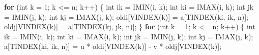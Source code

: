 \documentclass[
  12pt,
  letterpaper,
  DIV=11,
  numbers=noendperiod]{scrreprt}
\newenvironment{Shaded}{\begin{snugshade}}{\end{snugshade}}
\newcommand{\ControlFlowTok}[1]{\textcolor[rgb]{0.00,0.23,0.31}{\textbf{#1}}}
\newcommand{\DataTypeTok}[1]{\textcolor[rgb]{0.68,0.00,0.00}{#1}}
\newcommand{\DecValTok}[1]{\textcolor[rgb]{0.68,0.00,0.00}{#1}}
\newcommand{\NormalTok}[1]{\textcolor[rgb]{0.00,0.23,0.31}{#1}}
\newcommand{\OperatorTok}[1]{\textcolor[rgb]{0.37,0.37,0.37}{#1}}
\theoremstyle{remark}
\begin{document}
\begin{Shaded}
\begin{Highlighting}[]
                \ControlFlowTok{for} \OperatorTok{(}\DataTypeTok{int}\NormalTok{ k }\OperatorTok{=} \DecValTok{1}\OperatorTok{;}\NormalTok{ k }\OperatorTok{\textless{}=}\NormalTok{ n}\OperatorTok{;}\NormalTok{ k}\OperatorTok{++)} \OperatorTok{\{}
                    \DataTypeTok{int}\NormalTok{ ik }\OperatorTok{=}\NormalTok{ IMIN}\OperatorTok{(}\NormalTok{i}\OperatorTok{,}\NormalTok{ k}\OperatorTok{);}
                    \DataTypeTok{int}\NormalTok{ ki }\OperatorTok{=}\NormalTok{ IMAX}\OperatorTok{(}\NormalTok{i}\OperatorTok{,}\NormalTok{ k}\OperatorTok{);}
                    \DataTypeTok{int}\NormalTok{ jk }\OperatorTok{=}\NormalTok{ IMIN}\OperatorTok{(}\NormalTok{j}\OperatorTok{,}\NormalTok{ k}\OperatorTok{);}
                    \DataTypeTok{int}\NormalTok{ kj }\OperatorTok{=}\NormalTok{ IMAX}\OperatorTok{(}\NormalTok{j}\OperatorTok{,}\NormalTok{ k}\OperatorTok{);}
\NormalTok{                    oldi}\OperatorTok{[}\NormalTok{VINDEX}\OperatorTok{(}\NormalTok{k}\OperatorTok{)]} \OperatorTok{=}\NormalTok{ a}\OperatorTok{[}\NormalTok{TINDEX}\OperatorTok{(}\NormalTok{ki}\OperatorTok{,}\NormalTok{ ik}\OperatorTok{,}\NormalTok{ n}\OperatorTok{)];}
\NormalTok{                    oldj}\OperatorTok{[}\NormalTok{VINDEX}\OperatorTok{(}\NormalTok{k}\OperatorTok{)]} \OperatorTok{=}\NormalTok{ a}\OperatorTok{[}\NormalTok{TINDEX}\OperatorTok{(}\NormalTok{kj}\OperatorTok{,}\NormalTok{ jk}\OperatorTok{,}\NormalTok{ n}\OperatorTok{)];}
                \OperatorTok{\}}
                \ControlFlowTok{for} \OperatorTok{(}\DataTypeTok{int}\NormalTok{ k }\OperatorTok{=} \DecValTok{1}\OperatorTok{;}\NormalTok{ k }\OperatorTok{\textless{}=}\NormalTok{ n}\OperatorTok{;}\NormalTok{ k}\OperatorTok{++)} \OperatorTok{\{}
                    \DataTypeTok{int}\NormalTok{ ik }\OperatorTok{=}\NormalTok{ IMIN}\OperatorTok{(}\NormalTok{i}\OperatorTok{,}\NormalTok{ k}\OperatorTok{);}
                    \DataTypeTok{int}\NormalTok{ ki }\OperatorTok{=}\NormalTok{ IMAX}\OperatorTok{(}\NormalTok{i}\OperatorTok{,}\NormalTok{ k}\OperatorTok{);}
                    \DataTypeTok{int}\NormalTok{ jk }\OperatorTok{=}\NormalTok{ IMIN}\OperatorTok{(}\NormalTok{j}\OperatorTok{,}\NormalTok{ k}\OperatorTok{);}
                    \DataTypeTok{int}\NormalTok{ kj }\OperatorTok{=}\NormalTok{ IMAX}\OperatorTok{(}\NormalTok{j}\OperatorTok{,}\NormalTok{ k}\OperatorTok{);}
\NormalTok{                    a}\OperatorTok{[}\NormalTok{TINDEX}\OperatorTok{(}\NormalTok{ki}\OperatorTok{,}\NormalTok{ ik}\OperatorTok{,}\NormalTok{ n}\OperatorTok{)]} \OperatorTok{=}
\NormalTok{                        u }\OperatorTok{*}\NormalTok{ oldi}\OperatorTok{[}\NormalTok{VINDEX}\OperatorTok{(}\NormalTok{k}\OperatorTok{)]} \OperatorTok{{-}}\NormalTok{ v }\OperatorTok{*}\NormalTok{ oldj}\OperatorTok{[}\NormalTok{VINDEX}\OperatorTok{(}\NormalTok{k}\OperatorTok{)];}

\end{Highlighting}
\end{Shaded}
\end{document}
